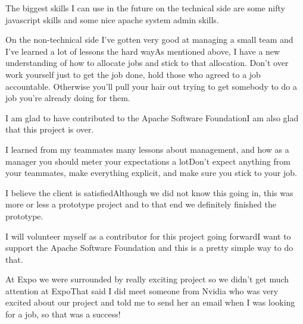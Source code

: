 The biggest skills I can use in the future on the technical side are some nifty javascript skills and some nice apache system admin skills.

On the non-technical side I've gotten very good at managing a small team and I've learned a lot of lessons the hard wayAs mentioned above, I have a new understanding of how to allocate jobs and stick to that allocation.
Don't over work yourself just to get the job done, hold those who agreed to a job accountable.
Otherwise you'll pull your hair out trying to get somebody to do a job you're already doing for them.

I am glad to have contributed to the Apache Software FoundationI am also glad that this project is over.

I learned from my teammates many lessons about management, and how as a manager you should meter your expectations a lotDon't expect anything from your teammates, make everything explicit, and make sure you stick to your job.

I believe the client is satisfiedAlthough we did not know this going in, this was more or less a prototype project and to that end we definitely finished the prototype.

I will volunteer myself as a contributor for this project going forwardI want to support the Apache Software Foundation and this is a pretty simple way to do that.

At Expo we were surrounded by really exciting project so we didn't get much attention at ExpoThat said I did meet someone from Nvidia who was very excited about our project and told me to send her an email when I was looking for a job, so that was a success!
